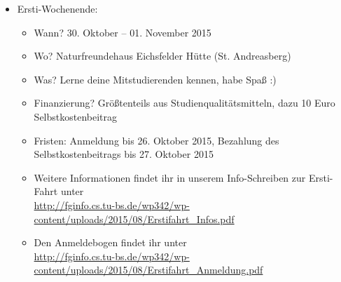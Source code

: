 \begin{itemize}
\begin{itemize}
\begin{itemize}
\end{itemize}
\end{itemize}
\item Ersti-Wochenende:
\begin{itemize}
\item Wann? 30. Oktober – 01. November 2015
\item Wo? Naturfreundehaus Eichsfelder Hütte (St. Andreasberg)
\item Was? Lerne deine Mitstudierenden kennen, habe Spaß :)
\item Finanzierung? Größtenteils aus Studienqualitätsmitteln, dazu 10 Euro Selbstkostenbeitrag
\item Fristen: Anmeldung bis 26. Oktober 2015, Bezahlung des Selbstkostenbeitrags bis 27. Oktober 2015
\item Weitere Informationen findet ihr in unserem Info-Schreiben zur Ersti-Fahrt unter\\ \url{http://fginfo.cs.tu-bs.de/wp342/wp-content/uploads/2015/08/Erstifahrt_Infos.pdf}
\item Den Anmeldebogen findet ihr unter\\ \url{http://fginfo.cs.tu-bs.de/wp342/wp-content/uploads/2015/08/Erstifahrt_Anmeldung.pdf}
\end{itemize}
\end{itemize}